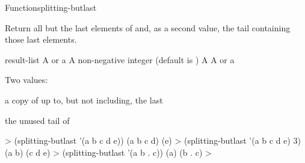 \documentclass[10pt,twoside,english,pdftex]{article}
\begin{document}
\begin{functiondoc}{Function}{splitting-butlast}{
    }
%
%
  
\fnsyntax

\fnpurpose Return all but the last  elements of 
and, as a second value, the tail containing those last 
elements. 

\fnpackage {}

\fnmodule {}

\fnargs
\begin{args}{result-list}
\arg[list] A  or a 
\arg[n] A non-negative integer (default is )
 A 
\arg[tail] A  or a 
\end{args}

\fnreturns Two values:
\begin{tightitemize}
\item a copy of  up to, but not including, the last
   
\item the unused tail of 
\end{tightitemize}

\fnexamples
%
\W\supp
\begin{example}
  > (splitting-butlast '(a b c d e))
  (a b c d)
  (e)
  > (splitting-butlast '(a b c d e) 3)
  (a b)
  (c d e)\goodpagebreak
  > (splitting-butlast '(a b . c))
  (a)
  (b . c)
  >
\end{example}

\end{functiondoc}

\end{document}
